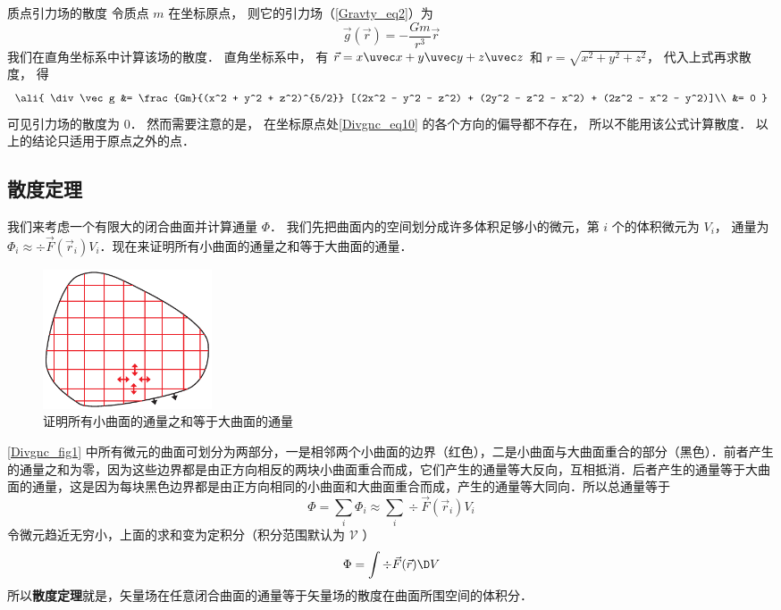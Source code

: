 \begin{exam}{质点引力场的散度}
令质点 $m$ 在坐标原点， 则它的引力场（\autoref{Gravty_eq2}）为
\begin{equation}\label{Divgnc_eq10}
\vec g(\vec r) = -\frac{Gm}{r^3}\vec r
\end{equation}
我们在直角坐标系中计算该场的散度． 直角坐标系中， 有 $\vec r = x\uvec x + y\uvec y + z\uvec z$ 和 $r = \sqrt{x^2 + y^2 + z^2}$， 代入上式再求散度， 得
\begin{equation}\ali{
\div \vec g &= \frac{Gm}{(x^2 + y^2 + z^2)^{5/2}} [(2x^2 - y^2 - z^2) + (2y^2 - z^2 - x^2) + (2z^2 - x^2 - y^2)]\\
&= 0
}\end{equation}
可见引力场的散度为 0． 然而需要注意的是， 在坐标原点处\autoref{Divgnc_eq10} 的各个方向的偏导都不存在， 所以不能用该公式计算散度． 以上的结论只适用于原点之外的点．
\end{exam}


\subsection{散度定理}

我们来考虑一个有限大的闭合曲面并计算通量 $\Phi$． 我们先把曲面内的空间划分成许多体积足够小的微元，第 $i$ 个的体积微元为 $V_i$， 通量为 ${\Phi _i} \approx \div \vec F({\vec r_i}){V_i}$．现在来证明所有小曲面的通量之和等于大曲面的通量．
\begin{figure}[ht]
\centering
\includegraphics[width=5cm]{./figures/Divgnc.pdf}
\caption{证明所有小曲面的通量之和等于大曲面的通量} \label{Divgnc_fig1}
\end{figure}
\autoref{Divgnc_fig1} 中所有微元的曲面可划分为两部分，一是相邻两个小曲面的边界（红色），二是小曲面与大曲面重合的部分（黑色）．前者产生的通量之和为零，因为这些边界都是由正方向相反的两块小曲面重合而成，它们产生的通量等大反向，互相抵消．后者产生的通量等于大曲面的通量，这是因为每块黑色边界都是由正方向相同的小曲面和大曲面重合而成，产生的通量等大同向．所以总通量等于
\begin{equation}
\Phi  = \sum_i \Phi _i  \approx \sum_i \div \vec F (\vec r_i) V_i
\end{equation}
令微元趋近无穷小，上面的求和变为定积分（积分范围默认为 $\mathcal V$ ）
\begin{equation}
\Phi  = \int {\div \vec F(\vec r)\D V}
\end{equation}
所以\textbf{散度定理}就是，矢量场在任意闭合曲面的通量等于矢量场的散度在曲面所围空间的体积分．



